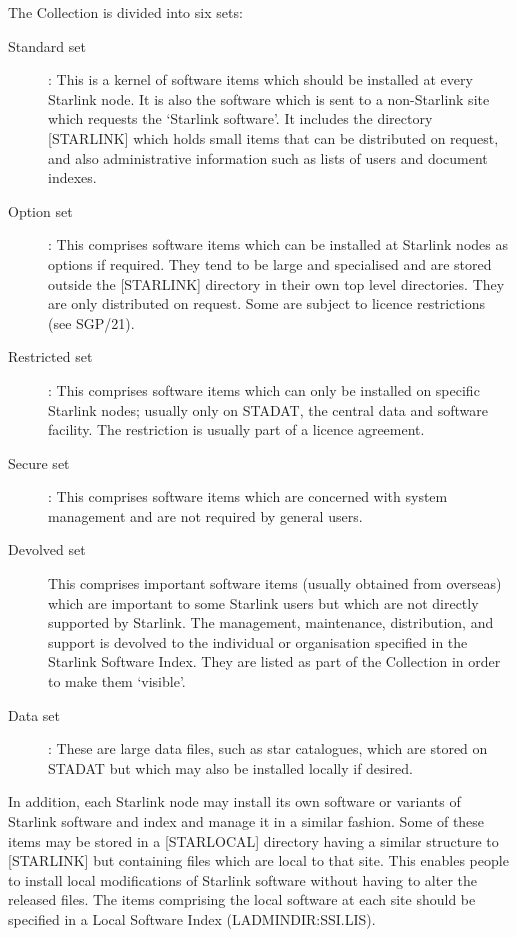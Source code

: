 The Collection is divided into six sets:
\begin{description}
\begin{description}
\item [Standard set]:
This is a kernel of software items which should be installed at every Starlink
node.
It is also the software which is sent to a non-Starlink site which requests the
`Starlink software'.
It includes the directory [STARLINK] which holds small items that can be
distributed on request, and also administrative information such as lists of
users and document indexes.
\item [Option set]:
This comprises software items which can be installed at Starlink nodes as
options if required.
They tend to be large and specialised and are stored outside the [STARLINK]
directory in their own top level directories.
They are only distributed on request.
Some are subject to licence restrictions (see SGP/21).
\item [Restricted set]:
This comprises software items which can only be installed on specific Starlink
nodes; usually only on STADAT, the central data and software facility.
The restriction is usually part of a licence agreement.
\item [Secure set]:
This comprises software items which are concerned with system management and
are not required by general users.
\item [Devolved set]
This comprises important software items (usually obtained from overseas) which
are important to some Starlink users but which are not directly supported by
Starlink.
The management, maintenance, distribution, and support is devolved to the
individual or organisation specified in the Starlink Software Index.
They are listed as part of the Collection in order to make them `visible'.
\item [Data set]:
These are large data files, such as star catalogues, which are stored on STADAT
but which may also be installed locally if desired.
\end{description}
\end{description}
In addition, each Starlink node may install its own software or variants of
Starlink software and index and manage it in a similar fashion.
Some of these items may be stored in a [STARLOCAL] directory having a similar
structure to [STARLINK] but containing files which are local to that site.
This enables people to install local modifications of Starlink software
without having to alter the released files.
The items comprising the local software at each site should be specified in
a Local Software Index (LADMINDIR:SSI.LIS).

